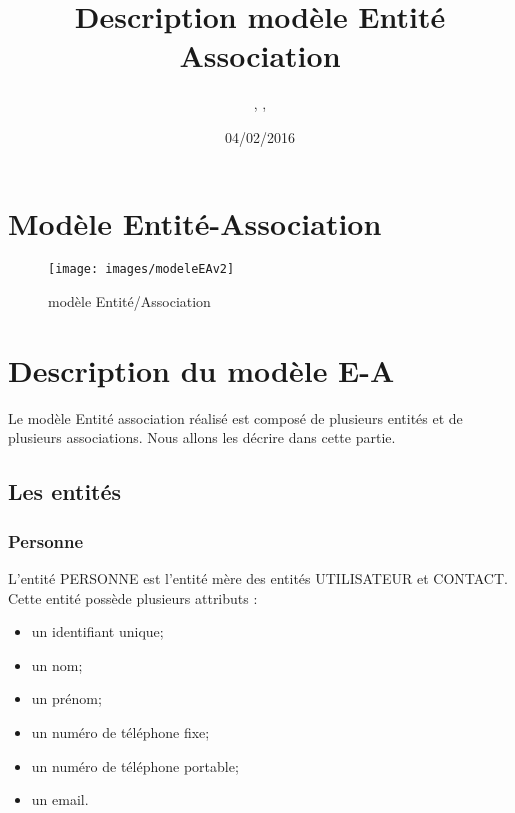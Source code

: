 \documentclass[asi, sansVersion]{picInsa}
\begin{document}
\title{Description modèle Entité Association}
\author{\Florian, \Mathieu, \Julie}
\date{04/02/2016} 

\maketitle

\tableofcontents

\chapter{Modèle Entité-Association}

\begin{landscape}
\begin{figure}
	\centering
	\texttt{[image: images/modeleEAv2]}
	\caption{\label{modele}modèle Entité/Association}
\end{figure}
\end{landscape}

\chapter{Description du modèle E-A}

Le modèle Entité association réalisé est composé de plusieurs entités et de plusieurs associations. Nous allons les décrire dans cette partie. \\ 

\section{Les entités}

\subsection*{Personne}

L'entité PERSONNE est l'entité mère des entités UTILISATEUR et CONTACT. \\
Cette entité possède plusieurs attributs : 
\begin{itemize}
\item un identifiant unique;
\item un nom; %
\item un prénom; %
\item un numéro de téléphone fixe; %
\item un numéro de téléphone portable; %
\item un email. %
\end{itemize}
\end{document}
